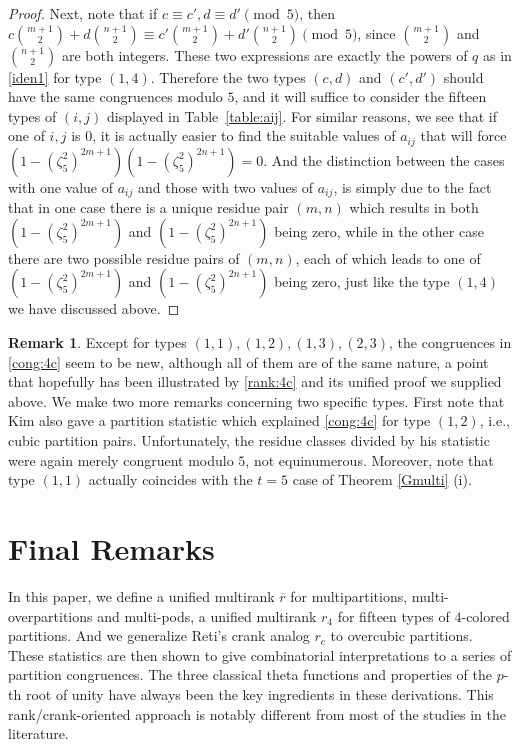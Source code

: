 \documentclass[12pt]{amsart}
\numberwithin{equation}{section}
\theoremstyle{plain}
\theoremstyle{definition}
\newtheorem{remark}[theorem]{Remark}
\begin{document}
\begin{proof}
Next, note that if $c\equiv c', d\equiv d' \pmod 5$, then $c\binom{m+1}{2}+d\binom{n+1}{2}\equiv c'\binom{m+1}{2}+d'\binom{n+1}{2} \pmod 5$, since $\binom{m+1}{2}$ and $\binom{n+1}{2}$ are both integers. These two expressions are exactly the powers of $q$ as in \eqref{iden1} for type $(1,4)$. Therefore the two types $(c,d)$ and $(c',d')$ should have the same congruences modulo $5$, and it will suffice to consider the fifteen types of $(i,j)$ displayed in Table~\ref{table:aij}. For similar reasons, we see that if one of $i,j$ is $0$, it is actually easier to find the suitable values of $a_{ij}$ that will force $(1-(\zeta_5^2)^{2m+1})(1-(\zeta_5^2)^{2n+1})=0$. And the distinction between the cases with one value of $a_{ij}$ and those with two values of $a_{ij}$, is simply due to the fact that in one case there is a unique residue pair $(m,n)$ which results in both $(1-(\zeta_5^2)^{2m+1})$ and $(1-(\zeta_5^2)^{2n+1})$ being zero, while in the other case there are two possible residue pairs of $(m,n)$, each of which leads to one of $(1-(\zeta_5^2)^{2m+1})$ and $(1-(\zeta_5^2)^{2n+1})$ being zero, just like the type $(1,4)$ we have discussed above.
\end{proof}
\begin{remark}
Except for types $(1,1),(1,2),(1,3),(2,3)$, the congruences in \eqref{cong:4c} seem to be new, although all of them are of the same nature, a point that hopefully has been illustrated by \eqref{rank:4c} and its unified proof we supplied above. We make two more remarks concerning two specific types. First note that Kim \cite{Kim3} also gave a partition statistic which explained \eqref{cong:4c} for type $(1,2)$, i.e., cubic partition pairs. Unfortunately, the residue classes divided by his statistic were again merely congruent modulo $5$, not equinumerous.
Moreover, note that type $(1,1)$ actually coincides with the $t=5$ case of Theorem \ref{Gmulti} (i).
\end{remark}


\section{Final Remarks}
In this paper, we define a unified multirank $\overline{r}$ for multipartitions, multi-overpartitions and multi-pods, a unified multirank $r_4$ for fifteen types of $4$-colored partitions. And we generalize Reti's crank analog $r_c$ to overcubic partitions. These statistics are then shown to give combinatorial interpretations to a series of partition congruences. The three classical theta functions and properties of the $p$-th root of unity have always been the key ingredients in these derivations. This rank/crank-oriented approach is notably different from most of the studies in the literature.
\end{document}
